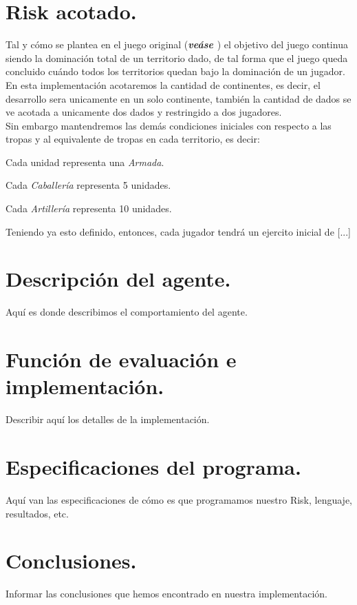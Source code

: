 \documentclass[10pt,twocolumn,draft]{article}
\begin{document}
\section{Risk acotado.}

Tal y c\'omo se plantea en el juego original (\textbf{\textit{ve\'ase \cite{RISK}}}) el objetivo del juego continua siendo la dominaci\'on total de un territorio dado, de tal forma
que el juego queda concluido cu\'ando todos los territorios quedan bajo la dominaci\'on de 
un jugador.\\
En esta implementaci\'on acotaremos la cantidad de continentes, es decir, el desarrollo sera unicamente en un solo continente, tambi\'en la cantidad de dados se ve acotada a unicamente dos dados y restringido a dos jugadores.\\

Sin embargo mantendremos las dem\'as condiciones iniciales con respecto a las tropas y al equivalente de tropas en cada territorio, es decir:
\begin{list}{*}{}
\item Cada unidad representa una \textit{Armada}.
\item Cada \textit{Caballer\'ia} representa 5 unidades.
\item Cada \textit{Artiller\'ia} representa 10 unidades.
\end{list}

Teniendo ya esto definido, entonces, cada jugador tendr\'a un ejercito inicial de [...]

\section{Descripci\'on del agente.}
Aqu\'i es donde describimos el comportamiento del agente.


\section{Funci\'on de evaluaci\'on e implementaci\'on.}
Describir aqu\'i los detalles de la implementaci\'on.

\section{Especificaciones del programa.}
Aqu\'i van las especificaciones de c\'omo es que programamos nuestro Risk, lenguaje, resultados, etc.

\section{Conclusiones.}
Informar las conclusiones que hemos encontrado en nuestra implementaci\'on.


\newpage
	
{}
\end{document}

